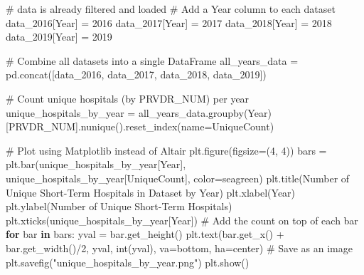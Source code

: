\documentclass[
  letterpaper,
  DIV=11,
  numbers=noendperiod]{scrartcl}
\newenvironment{Shaded}{\begin{snugshade}}{\end{snugshade}}
\newcommand{\BuiltInTok}[1]{\textcolor[rgb]{0.00,0.23,0.31}{#1}}
\newcommand{\CommentTok}[1]{\textcolor[rgb]{0.37,0.37,0.37}{#1}}
\newcommand{\ControlFlowTok}[1]{\textcolor[rgb]{0.00,0.23,0.31}{\textbf{#1}}}
\newcommand{\DecValTok}[1]{\textcolor[rgb]{0.68,0.00,0.00}{#1}}
\newcommand{\KeywordTok}[1]{\textcolor[rgb]{0.00,0.23,0.31}{\textbf{#1}}}
\newcommand{\NormalTok}[1]{\textcolor[rgb]{0.00,0.23,0.31}{#1}}
\newcommand{\OperatorTok}[1]{\textcolor[rgb]{0.37,0.37,0.37}{#1}}
\newcommand{\StringTok}[1]{\textcolor[rgb]{0.13,0.47,0.30}{#1}}
\begin{document}
\begin{Shaded}
\begin{Highlighting}[]
\CommentTok{\# data is already filtered and loaded}
\CommentTok{\# Add a \textquotesingle{}Year\textquotesingle{} column to each dataset}
\NormalTok{data\_2016[}\StringTok{\textquotesingle{}Year\textquotesingle{}}\NormalTok{] }\OperatorTok{=} \DecValTok{2016}
\NormalTok{data\_2017[}\StringTok{\textquotesingle{}Year\textquotesingle{}}\NormalTok{] }\OperatorTok{=} \DecValTok{2017}
\NormalTok{data\_2018[}\StringTok{\textquotesingle{}Year\textquotesingle{}}\NormalTok{] }\OperatorTok{=} \DecValTok{2018}
\NormalTok{data\_2019[}\StringTok{\textquotesingle{}Year\textquotesingle{}}\NormalTok{] }\OperatorTok{=} \DecValTok{2019}

\CommentTok{\# Combine all datasets into a single DataFrame}
\NormalTok{all\_years\_data }\OperatorTok{=}\NormalTok{ pd.concat([data\_2016, data\_2017, data\_2018, data\_2019])}

\CommentTok{\# Count unique hospitals (by PRVDR\_NUM) per year}
\NormalTok{unique\_hospitals\_by\_year }\OperatorTok{=}\NormalTok{ all\_years\_data.groupby(}\StringTok{\textquotesingle{}Year\textquotesingle{}}\NormalTok{)[}\StringTok{\textquotesingle{}PRVDR\_NUM\textquotesingle{}}\NormalTok{].nunique().reset\_index(name}\OperatorTok{=}\StringTok{\textquotesingle{}UniqueCount\textquotesingle{}}\NormalTok{)}

\CommentTok{\# Plot using Matplotlib instead of Altair}
\NormalTok{plt.figure(figsize}\OperatorTok{=}\NormalTok{(}\DecValTok{4}\NormalTok{, }\DecValTok{4}\NormalTok{))}
\NormalTok{bars }\OperatorTok{=}\NormalTok{ plt.bar(unique\_hospitals\_by\_year[}\StringTok{\textquotesingle{}Year\textquotesingle{}}\NormalTok{], unique\_hospitals\_by\_year[}\StringTok{\textquotesingle{}UniqueCount\textquotesingle{}}\NormalTok{], color}\OperatorTok{=}\StringTok{\textquotesingle{}seagreen\textquotesingle{}}\NormalTok{)}
\NormalTok{plt.title(}\StringTok{\textquotesingle{}Number of Unique Short{-}Term Hospitals in Dataset by Year\textquotesingle{}}\NormalTok{)}
\NormalTok{plt.xlabel(}\StringTok{\textquotesingle{}Year\textquotesingle{}}\NormalTok{)}
\NormalTok{plt.ylabel(}\StringTok{\textquotesingle{}Number of Unique Short{-}Term Hospitals\textquotesingle{}}\NormalTok{)}
\NormalTok{plt.xticks(unique\_hospitals\_by\_year[}\StringTok{\textquotesingle{}Year\textquotesingle{}}\NormalTok{])}
\CommentTok{\# Add the count on top of each bar}
\ControlFlowTok{for}\NormalTok{ bar }\KeywordTok{in}\NormalTok{ bars:}
\NormalTok{    yval }\OperatorTok{=}\NormalTok{ bar.get\_height()}
\NormalTok{    plt.text(bar.get\_x() }\OperatorTok{+}\NormalTok{ bar.get\_width()}\OperatorTok{/}\DecValTok{2}\NormalTok{, yval, }\BuiltInTok{int}\NormalTok{(yval), va}\OperatorTok{=}\StringTok{\textquotesingle{}bottom\textquotesingle{}}\NormalTok{, ha}\OperatorTok{=}\StringTok{\textquotesingle{}center\textquotesingle{}}\NormalTok{)}
\CommentTok{\# Save as an image}
\NormalTok{plt.savefig(}\StringTok{"unique\_hospitals\_by\_year.png"}\NormalTok{)}
\NormalTok{plt.show()}
\end{Highlighting}
\end{Shaded}
\end{document}
